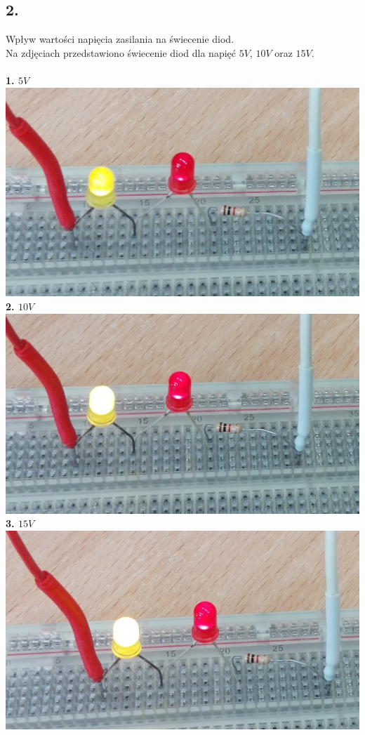 \documentclass[polish,a4paper]{article}
\begin{document}
\subsection*{2.}
Wpływ wartości napięcia zasilania na świecenie diod.\\
Na zdjęciach przedstawiono świecenie diod dla napięć $5V$, $10V$ oraz $15V$.\\
\\
\textbf{1. $5V$}\\
\includegraphics[width=\textwidth]{5v}
\\
\textbf{2. $10V$}\\
\includegraphics[width=\textwidth]{10v}
\\
\textbf{3. $15V$}\\
\includegraphics[width=\textwidth]{15V}
\end{document}
